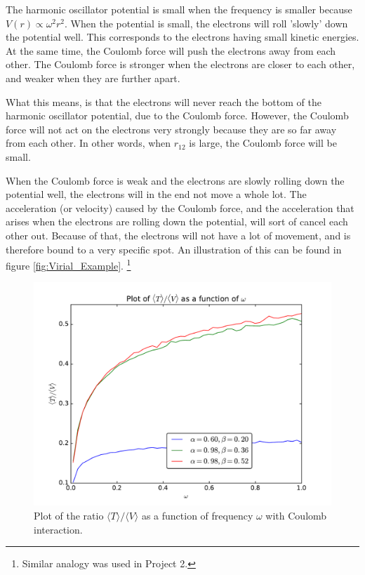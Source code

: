 \documentclass[12pt]{article}
\begin{document}
The harmonic oscillator potential is small when the frequency is smaller because $V(r) \propto \omega^2r^2$. When the potential is small, the electrons will roll 'slowly' down the potential well. This corresponds to the electrons having small kinetic energies. At the same time, the Coulomb force will push the electrons away from each other. The Coulomb force is stronger when the electrons are closer to each other, and weaker when they are further apart.

What this means, is that the electrons will never reach the bottom of the harmonic oscillator potential, due to the Coulomb force. However, the Coulomb force will not act on the electrons very strongly because they are so far away from each other. In other words, when $r_{12}$ is large, the Coulomb force will be small.

When the Coulomb force is weak and the electrons are slowly rolling down the potential well, the electrons will in the end not move a whole lot. The acceleration (or velocity) caused by the Coulomb force, and the acceleration that arises when the electrons are rolling down the potential, will sort of cancel each other out. Because of that, the electrons will not have a lot of movement, and is therefore bound to a very specific spot. An illustration of this can be found in figure \ref{fig:Virial_Example}. \footnote{Similar analogy was used in Project 2.}

\begin{figure}[h]
\centering
\includegraphics[width=\linewidth]{Plots/Virial_Plot.pdf}
\caption{Plot of the ratio $\langle T \rangle / \langle V \rangle$ as a function of frequency $\omega$ with Coulomb interaction.}
\label{fig:Virial_Plot}
\end{figure}
\end{document}
